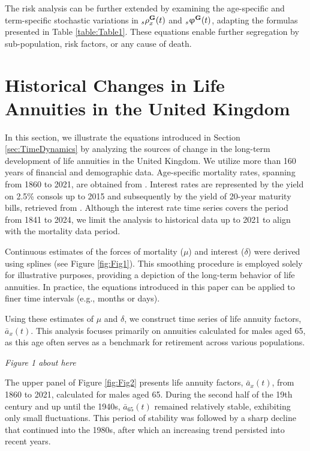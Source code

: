 \documentclass[12pt]{article}
\begin{document}
The risk analysis can be further extended by examining the age-specific and term-specific stochastic variations in \( {}_s{\rho}^{\bf{G}}_x(t) \) and \( {}_s{\upvarphi}^{\bf{G}}(t) \), adapting the formulas presented in Table \ref{table:Table1}. These equations enable further segregation by sub-population, risk factors, or any cause of death.


\section{Historical Changes in Life Annuities in the United Kingdom}\label{sec:UK_Illustration}

In this section, we illustrate the equations introduced in Section \ref{sec:TimeDynamics} by analyzing the sources of change in the long-term development of life annuities in the United Kingdom. We utilize more than 160 years of financial and demographic data. Age-specific mortality rates, spanning from 1860 to 2021, are obtained from \citep{HMD2024}. Interest rates are represented by the yield on 2.5\% consols up to 2015 and subsequently by the yield of 20-year maturity bills, retrieved from \citep{BankOfEngland2024}. Although the interest rate time series covers the period from 1841 to 2024, we limit the analysis to historical data up to 2021 to align with the mortality data period.

Continuous estimates of the forces of mortality (\(\mu\)) and interest (\(\delta\)) were derived using splines \citep{green1993nonparametric,camarda2012mortalitysmooth} (see Figure \ref{fig:Fig1}). This smoothing procedure is employed solely for illustrative purposes, providing a depiction of the long-term behavior of life annuities. In practice, the equations introduced in this paper can be applied to finer time intervals (e.g., months or days).

Using these estimates of \(\mu\) and \(\delta\), we construct time series of life annuity factors, \( \bar{a}_x(t) \). This analysis focuses primarily on annuities calculated for males aged 65, as this age often serves as a benchmark for retirement across various populations.


\begin{center}
	\textit{Figure 1 about here}
\end{center}

The upper panel of Figure \ref{fig:Fig2} presents life annuity factors, \( \bar{a}_x(t) \), from 1860 to 2021, calculated for males aged 65. During the second half of the 19th century and up until the 1940s, \( \bar{a}_{65}(t) \) remained relatively stable, exhibiting only small fluctuations. This period of stability was followed by a sharp decline that continued into the 1980s, after which an increasing trend persisted into recent years. 
\end{document}
